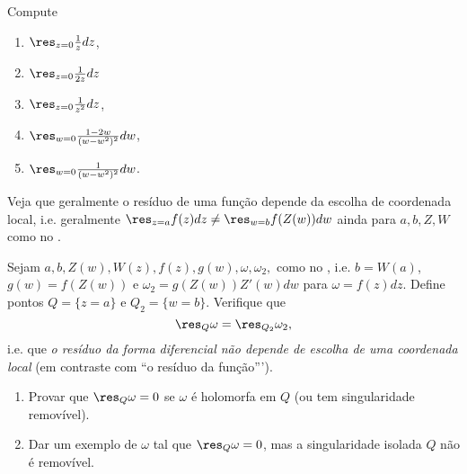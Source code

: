 \begin{problema}
Compute
\begin{enumerate}
\item $\res_{z=0} \frac{1}{z} dz$,
\item $\res_{z=0} \frac{1}{2z} dz$
\item $\res_{z=0} \frac{1}{z^2} dz$, %
\item %
      $\res_{w=0} \frac{1-2w}{(w-w^2)^2} dw$, %
\item $\res_{w=0} \frac{1}{(w-w^2)^2} dw$. %
\end{enumerate}
Veja que geralmente o resíduo de uma função depende da escolha de coordenada local,
i.e. geralmente $\res_{z=a} f(z) dz \neq \res_{w=b} f(Z(w)) dw$ ainda
para $a,b,Z,W$ como no .
\end{problema}

\begin{problema}
Sejam $a,b,Z(w),W(z),f(z),g(w),\omega,\omega_2,$ como no ,
i.e. $b=W(a)$, $g(w) = f(Z(w))$ e $\omega_2 = g(Z(w)) Z'(w) dw$ para $\omega = f(z) dz$.
Define pontos $Q = \{ z=a \}$ e $Q_2 = \{ w=b \}$.
Verifique que
\[ \res_Q \omega = \res_{Q_2} \omega_2, \]
i.e. que \emph{o resíduo da forma diferencial não depende de escolha de uma coordenada local}
(em contraste com ``o resíduo da função''').
\end{problema}

\begin{problema}
\begin{enumerate}
\item Provar que $\res_Q \omega = 0$ se $\omega$ é holomorfa em $Q$ (ou tem singularidade removível).
\item Dar um exemplo de $\omega$ tal que $\res_Q \omega = 0$,
mas a singularidade isolada $Q$ não é removível.
\end{enumerate}
\end{problema}

